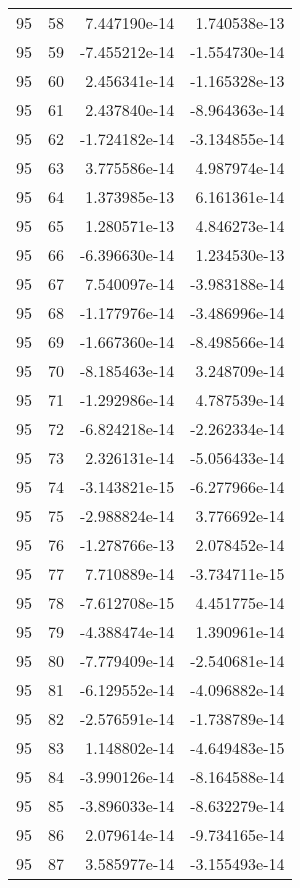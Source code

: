 \begin{tabular}{rrrr}
  95 &   58 &  7.447190e-14 &  1.740538e-13 \\
  95 &   59 & -7.455212e-14 & -1.554730e-14 \\
  95 &   60 &  2.456341e-14 & -1.165328e-13 \\
  95 &   61 &  2.437840e-14 & -8.964363e-14 \\
  95 &   62 & -1.724182e-14 & -3.134855e-14 \\
  95 &   63 &  3.775586e-14 &  4.987974e-14 \\
  95 &   64 &  1.373985e-13 &  6.161361e-14 \\
  95 &   65 &  1.280571e-13 &  4.846273e-14 \\
  95 &   66 & -6.396630e-14 &  1.234530e-13 \\
  95 &   67 &  7.540097e-14 & -3.983188e-14 \\
  95 &   68 & -1.177976e-14 & -3.486996e-14 \\
  95 &   69 & -1.667360e-14 & -8.498566e-14 \\
  95 &   70 & -8.185463e-14 &  3.248709e-14 \\
  95 &   71 & -1.292986e-14 &  4.787539e-14 \\
  95 &   72 & -6.824218e-14 & -2.262334e-14 \\
  95 &   73 &  2.326131e-14 & -5.056433e-14 \\
  95 &   74 & -3.143821e-15 & -6.277966e-14 \\
  95 &   75 & -2.988824e-14 &  3.776692e-14 \\
  95 &   76 & -1.278766e-13 &  2.078452e-14 \\
  95 &   77 &  7.710889e-14 & -3.734711e-15 \\
  95 &   78 & -7.612708e-15 &  4.451775e-14 \\
  95 &   79 & -4.388474e-14 &  1.390961e-14 \\
  95 &   80 & -7.779409e-14 & -2.540681e-14 \\
  95 &   81 & -6.129552e-14 & -4.096882e-14 \\
  95 &   82 & -2.576591e-14 & -1.738789e-14 \\
  95 &   83 &  1.148802e-14 & -4.649483e-15 \\
  95 &   84 & -3.990126e-14 & -8.164588e-14 \\
  95 &   85 & -3.896033e-14 & -8.632279e-14 \\
  95 &   86 &  2.079614e-14 & -9.734165e-14 \\
  95 &   87 &  3.585977e-14 & -3.155493e-14 \\

\end{tabular}
